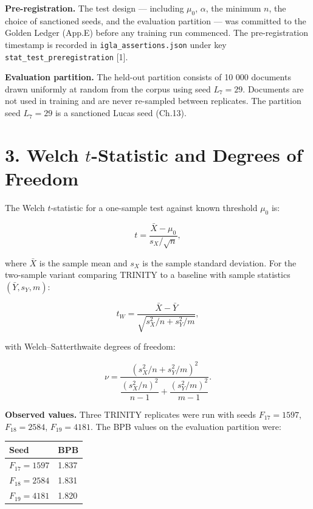 \textbf{Pre-registration.} The test design ---
including \(\mu_0\), \(\alpha\), the minimum
\(n\), the choice of sanctioned seeds, and the
evaluation partition --- was committed to the
Golden Ledger (App.E) before any training run
commenced. The pre-registration timestamp is
recorded in \texttt{igla\_assertions.json} under
key \texttt{stat\_test\_preregistration} [1].

\textbf{Evaluation partition.} The held-out
partition consists of 10 000 documents drawn
uniformly at random from the corpus using seed
\(L_7 = 29\). Documents are not used in training
and are never re-sampled between replicates. The
partition seed \(L_7 = 29\) is a sanctioned Lucas
seed (Ch.13).

\section{\texorpdfstring{3. Welch
\(t\)-Statistic and Degrees of
Freedom}{3. Welch t-Statistic and Degrees of Freedom}}\label{fa_19:welch-t-statistic-and-degrees-of-freedom}

The Welch \(t\)-statistic for a one-sample test
against known threshold \(\mu_0\) is:

\[t = \frac{\bar{X} - \mu_0}{s_X / \sqrt{n}},\]

where \(\bar{X}\) is the sample mean and \(s_X\)
is the sample standard deviation. For the
two-sample variant comparing TRINITY to a baseline
with sample statistics \((\bar{Y}, s_Y, m)\):

\[t_W = \frac{\bar{X} - \bar{Y}}{\sqrt{s_X^2/n + s_Y^2/m}},\]

with Welch--Satterthwaite degrees of freedom:

\[\nu = \frac{(s_X^2/n + s_Y^2/m)^2}{\dfrac{(s_X^2/n)^2}{n-1} + \dfrac{(s_Y^2/m)^2}{m-1}}.\]

\textbf{Observed values.} Three TRINITY replicates
were run with seeds \(F_{17}=1597\),
\(F_{18}=2584\), \(F_{19}=4181\). The BPB values
on the evaluation partition were:

\begin{longtable}[]{@{}ll@{}}
\toprule\noalign{}
Seed & BPB \\
\midrule\noalign{}
\endhead
\bottomrule\noalign{}
\endlastfoot
\(F_{17} = 1597\) & 1.837 \\
\(F_{18} = 2584\) & 1.831 \\
\(F_{19} = 4181\) & 1.820 \\
\end{longtable}

